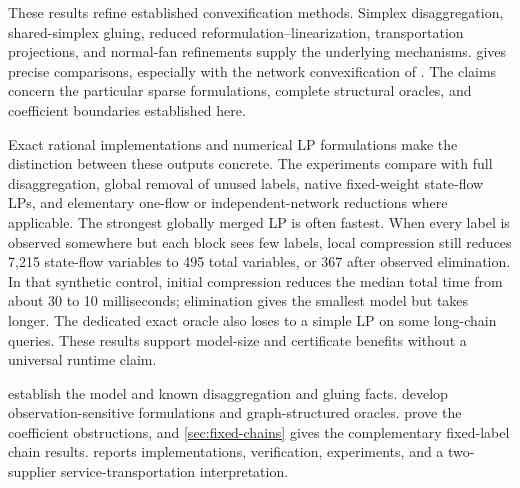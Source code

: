 These results refine established convexification methods. Simplex
disaggregation, shared-simplex gluing, reduced reformulation--linearization,
transportation projections, and normal-fan refinements supply the underlying
mechanisms.  gives precise comparisons, especially
with the network convexification of \citet{KhademniaDavarnia2025}.
The claims concern the particular sparse formulations, complete structural
oracles, and coefficient boundaries established here.

Exact rational implementations and numerical LP formulations make the
distinction between these outputs concrete. The experiments compare with
full disaggregation, global removal of unused labels, native fixed-weight
state-flow LPs, and elementary one-flow or independent-network reductions
where applicable. The strongest globally merged LP is often fastest.
When every label is observed somewhere but each block sees few labels,
local compression still reduces 7,215 state-flow variables to 495 total
variables, or 367 after observed elimination. In that synthetic control,
initial compression reduces the median total time from about 30 to 10
milliseconds; elimination gives the smallest model but takes longer.
The dedicated exact oracle also loses to a simple LP on some long-chain
queries. These results support model-size and certificate benefits without
a universal runtime claim.

 establish the model and known disaggregation
and gluing facts. 
develop observation-sensitive formulations and graph-structured oracles.
 prove the coefficient obstructions,
and \cref{sec:fixed-chains} gives the complementary fixed-label chain results.
 reports implementations, verification, experiments,
and a two-supplier service-transportation interpretation.
